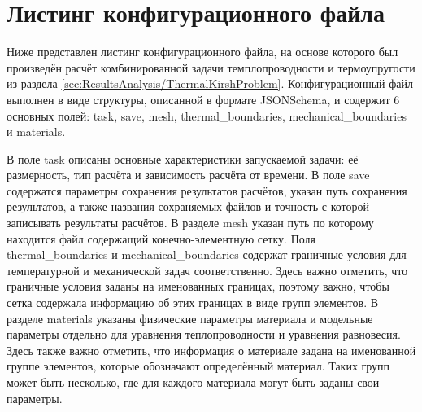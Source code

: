 \chapter{Листинг конфигурационного файла}\label{app:A}

Ниже представлен листинг конфигурационного файла, на основе которого был произведён расчёт комбинированной задачи темплопроводности и термоупругости из раздела \ref{sec:ResultsAnalysis/ThermalKirshProblem}. Конфигурационный файл выполнен в виде структуры, описанной в формате JSONSchema, и содержит 6 основных полей: task, save, mesh, thermal\_boundaries, mechanical\_boundaries и materials.

В поле task описаны основные характеристики запускаемой задачи: её размерность, тип расчёта и зависимость расчёта от времени. В поле save содержатся параметры сохранения результатов расчётов, указан путь сохранения результатов, а также названия сохраняемых файлов и точность с которой записывать результаты расчётов. В разделе mesh указан путь по которому находится файл содержащий конечно-элементную сетку. Поля thermal\_boundaries и mechanical\_boundaries содержат граничные условия для температурной и механической задач соответственно. Здесь важно отметить, что граничные условия заданы на именованных границах, поэтому важно, чтобы сетка содержала информацию об этих границах в виде групп элементов. В разделе materials указаны физические параметры материала и модельные параметры отдельно для уравнения теплопроводности и уравнения равновесия. Здесь также важно отметить, что информация о материале задана на именованной группе элементов, которые обозначают определённый материал. Таких групп может быть несколько, где для каждого материала могут быть заданы свои параметры.

\begingroup
\captiondelim{ } %

\endgroup
